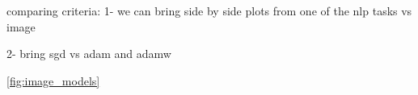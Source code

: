 comparing criteria:
1- we can bring side by side plots from one of the nlp tasks vs image

2- bring sgd vs adam and adamw


\autoref{fig:image_models}
\begin{figure}[t]
    \centering
\end{figure}
